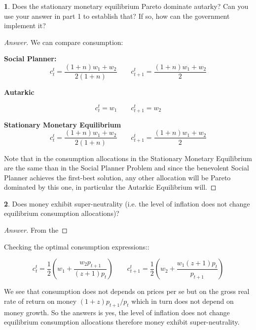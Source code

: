 \documentclass{article}
\theoremstyle{definition}
\newtheorem{subproblem}{}[problem]
\begin{document}
\begin{subproblem}
Does the stationary monetary equilibrium Pareto dominate autarky? Can you use your
answer in part 1 to establish that? If so, how can the government implement it?
\end{subproblem}

\begin{proof}[Answer]
We can compare consumption:

\textbf{Social Planner:}
$$c_t^t=\frac{(1+n)w_1+w_2}{2(1+n)} \qquad c^t_{t+1}=\frac{(1+n)w_1+w_2}{2}$$

\textbf{Autarkic}

$$c_t^{t} = w_1 \qquad c^t_{t+1} = w_2$$

\textbf{Stationary Monetary Equilibrium}
$$ c_{t}^{t}=\frac{(1+n) w_{1}+w_{2}}{2(1+n)} \qquad c^t_{t+1} =\frac{(1+n) w_{1}+w_{2}}{2} $$

Note that in the consumption allocations in the Stationary Monetary Equilibrium are the same than in the Social Planner Problem and since the benevolent Social Planner achieves the first-best solution, any other allocation will be Pareto dominated by this one, in particular the Autarkic Equilibrium will.

\end{proof}

\begin{subproblem}
Does money exhibit super-neutrality (i.e. the level of inflation does not change equilibrium
consumption allocations)?
\end{subproblem}

\begin{proof}[Answer]
From the 
\end{proof}
Checking the optimal consumption expressions::

$$ c^t_{t} =\frac{1}{2} \left(w_1+\frac{w_2 p_{t+1}}{(z+1) p_t}\right) \qquad c^t_{t+1} = \frac{1}{2} \left(w_2+\frac{w_1 (z+1) p_t}{p_{t+1}}\right)$$

We see that consumption does not depends on prices per se but on the gross real rate of return on money $(1+z)p_{t+1}/p_{t}$ which in turn does not depend on money growth. So the answers is yes, the level of inflation does not change equilibrium consumption allocations therefore money exhibit super-neutrality.
\end{document}
